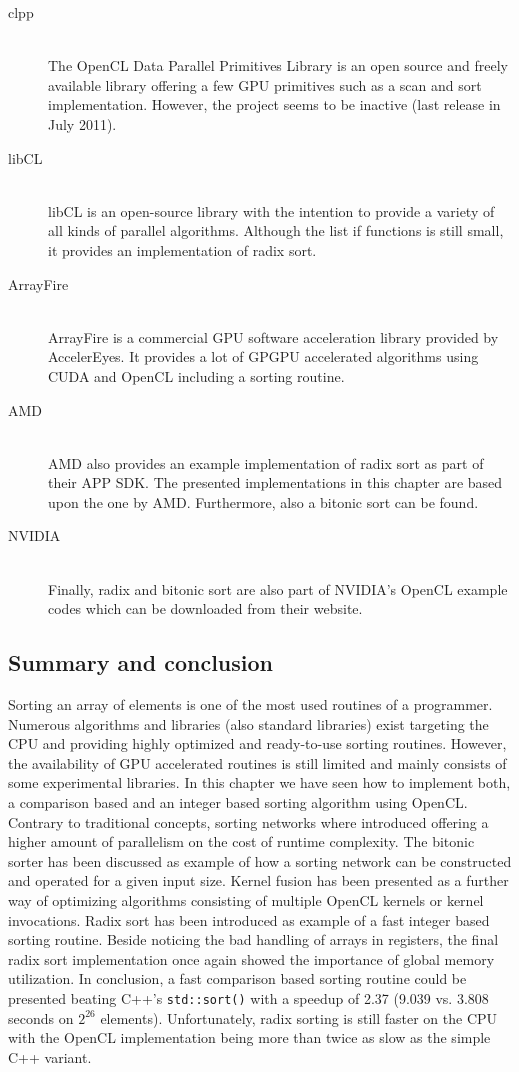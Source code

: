 \begin{description}
	\item[clpp \cite{clpp}] \hfill \\
	The OpenCL Data Parallel Primitives Library is an open source and freely available library offering a few GPU primitives such as a scan and sort implementation. However, the project seems to be inactive (last release in July 2011).
	\item[libCL \cite{libCL}] \hfill \\
	libCL is an open-source library with the intention to provide a variety of all kinds of parallel algorithms. Although the list if functions is still small, it provides an implementation of radix sort.
	\item[ArrayFire \cite{arrayfire}] \hfill \\
	ArrayFire is a commercial GPU software acceleration library provided by AccelerEyes. It provides a lot of GPGPU accelerated algorithms using CUDA and OpenCL including a sorting routine.
	\item[AMD \cite{amd_app_sdk}] \hfill \\
	AMD also provides an example implementation of radix sort as part of their APP SDK. The presented implementations in this chapter are based upon the one by AMD. Furthermore, also a bitonic sort can be found.
	\item[NVIDIA \cite{nvidia_opencl_samples}] \hfill \\
	Finally, radix and bitonic sort are also part of NVIDIA's OpenCL example codes which can be downloaded from their website.
\end{description}

\subsection{Summary and conclusion}
Sorting an array of elements is one of the most used routines of a programmer. Numerous algorithms and libraries (also standard libraries) exist targeting the CPU and providing highly optimized and ready-to-use sorting routines. However, the availability of GPU accelerated routines is still limited and mainly consists of some experimental libraries. In this chapter we have seen how to implement both, a comparison based and an integer based sorting algorithm using OpenCL. Contrary to traditional concepts, sorting networks where introduced offering a higher amount of parallelism on the cost of runtime complexity. The bitonic sorter has been discussed as example of how a sorting network can be constructed and operated for a given input size. Kernel fusion has been presented as a further way of optimizing algorithms consisting of multiple OpenCL kernels or kernel invocations. Radix sort has been introduced as example of a fast integer based sorting routine. Beside noticing the bad handling of arrays in registers, the final radix sort implementation once again showed the importance of global memory utilization.
In conclusion, a fast comparison based sorting routine could be presented beating C++'s \lstinline!std::sort()! with a speedup of 2.37 (9.039 vs. 3.808 seconds on $2^{26}$ elements). Unfortunately, radix sorting is still faster on the CPU with the OpenCL implementation being more than twice as slow as the simple C++ variant.
